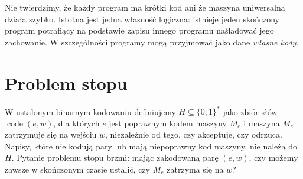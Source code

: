 \begin{uwaga}
Nie twierdzimy, że każdy program ma krótki kod ani że
maszyna uniwersalna działa szybko. Istotna jest jedna
własność logiczna: istnieje jeden skończony program
potrafiący na podstawie zapisu innego programu naśladować
jego zachowanie. W szczególności programy mogą przyjmować
jako dane \emph{własne kody}.
\end{uwaga}

\section{Problem stopu}\label{sec:computability-halting}
\begin{definicja}\label{def:computability-halting}
W ustalonym binarnym kodowaniu definiujemy
$H\subseteq\{0,1\}^*$ jako zbiór słów
$\operatorname{code}(e,w)$, dla których $e$ jest poprawnym
kodem maszyny $M_e$ i maszyna $M_e$ zatrzymuje się
na wejściu $w$, niezależnie od tego, czy akceptuje,
czy odrzuca. Napisy, które nie kodują pary lub mają
niepoprawny kod maszyny, nie należą do $H$.
Pytanie problemu stopu brzmi: mając zakodowaną parę
$(e,w)$, czy możemy zawsze w skończonym czasie ustalić,
czy $M_e$ zatrzyma się na $w$?
\end{definicja}


